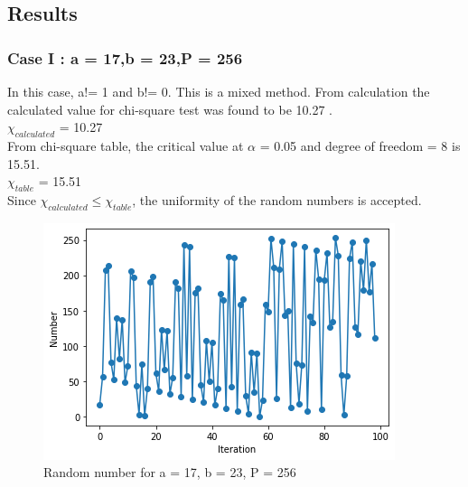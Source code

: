 \documentclass[10pt,journal,cspaper,compsoc]{IEEEtran}
\begin{document}
  \subsection{Results}
  \subsubsection*{Case I : a = 17,b = 23,P = 256}
  In this case, a!= 1 and b!= 0. This is a mixed method.
  From calculation the calculated value for chi-square test was found to be 10.27 .\\
  $\chi_{calculated}$ = 10.27\\
  From chi-square table, the critical value at $\alpha$ = 0.05 and degree of freedom = 8 is 15.51.\\
  $\chi_{table}$ = 15.51\\
  Since $\chi_{calculated} \leq \chi_{table}$, the uniformity of the random numbers is accepted.
  \begin{figure}[h!]
    \centering
    \includegraphics[scale = 0.65]{images/Exp3_Example1.png}
    \caption{Random number for a = 17, b = 23, P = 256}
  \end{figure}
\end{document}
